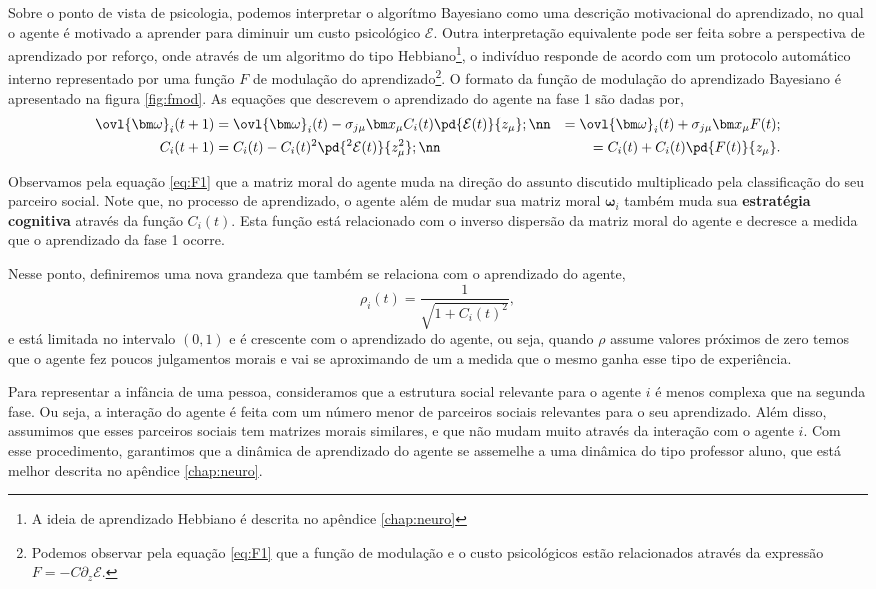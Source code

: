 Sobre o ponto de vista de psicologia, podemos interpretar o algorítmo
Bayesiano como uma descrição motivacional do aprendizado, no qual o agente é
motivado a aprender para diminuir um custo psicológico $\mathcal E$. Outra
interpretação equivalente pode ser feita sobre a perspectiva de aprendizado
por reforço, onde através de um algoritmo do tipo Hebbiano\footnote{A
ideia de aprendizado Hebbiano é descrita no apêndice \ref{chap:neuro}},
o indivíduo responde de acordo com um protocolo automático interno
representado por uma função $F$ de modulação do aprendizado\footnote{
Podemos observar pela equação \ref{eq:F1} que a função de modulação
e o custo psicológicos estão relacionados através da expressão $F =
-C\partial_z \mathcal E $. }.  O formato da função de modulação do
aprendizado Bayesiano é apresentado na figura \ref{fig:fmod}.  As equações
que descrevem o aprendizado do agente na fase 1 são dadas por,
\begin{align}
 \ovl{\bm \omega}_i(t+1) 
    &= \ovl{\bm \omega}_i(t) - 
        \sigma_{j\mu} \bm x_\mu C_i(t)\pd{\mathcal E (t)}{z_\mu}; \nn
        &= \ovl{\bm \omega}_i(t) + \sigma_{j\mu} \bm x_\mu  F(t); \label{eq:F1}\\
 C_i(t+1) 
    &= C_i(t) - C_i(t)^2 \pd{^2 \mathcal E (t)}{z_\mu^2}; \nn
    &= C_i(t) + C_i(t) \pd{F(t)}{z_\mu}.
 \label{eq:C}
\end{align}

Observamos pela equação \ref{eq:F1} que a matriz moral do agente muda
na direção do assunto discutido multiplicado pela classificação do
seu parceiro social. Note que, no processo de aprendizado, o agente  além
de mudar sua matriz moral $\bm \omega_i$ também muda sua \textbf{estratégia
cognitiva} através da função $C_i(t)$. Esta função está relacionado
com o inverso dispersão da matriz moral do agente e decresce a medida que
o aprendizado da fase 1 ocorre.

Nesse ponto, definiremos uma nova grandeza que também se relaciona com o
aprendizado do agente, 
\begin{equation}
    \rho_i(t) = \frac{1}{\sqrt{1 + C_i(t)^2}},
\end{equation}
e está limitada no intervalo $(0,1)$ e é crescente com o aprendizado do
agente, ou seja, quando $\rho$ assume valores próximos de zero temos que o
agente fez poucos julgamentos morais e vai se aproximando de um a
medida que o mesmo ganha esse tipo de experiência. 

Para representar a infância de uma pessoa, consideramos que a estrutura social
relevante para o agente $i$ é menos complexa que na segunda fase. Ou seja,
a interação do agente é feita com um número menor de parceiros sociais
relevantes para o seu aprendizado. Além disso, assumimos que esses parceiros
sociais tem matrizes morais similares, e que não mudam muito através da
interação com o agente $i$. Com esse procedimento, garantimos que
a dinâmica de aprendizado do agente se assemelhe a uma dinâmica do tipo
professor aluno, que está melhor descrita no apêndice \ref{chap:neuro}. 

